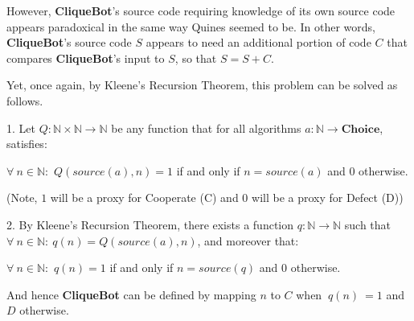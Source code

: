 However, \textbf{CliqueBot}'s source code requiring knowledge of its own source code appears paradoxical in the same way Quines seemed to be. In other words, \textbf{CliqueBot}'s source code $S$ appears to need an additional portion of code $C$ that compares \textbf{CliqueBot}'s input to $S$, so that $S = S + C$.

Yet, once again, by Kleene's Recursion Theorem, this problem can be solved as follows.

1. Let $Q: \mathbb{N} \times \mathbb{N} \rightarrow \mathbb{N}$ be any function that for all algorithms $a: \mathbb{N} \rightarrow \textbf{Choice}$, satisfies:
\begin{center}
    $\forall\ n \in \mathbb{N}:$ $Q(source(a), n) = 1$ if and only if $n = source(a)$ and $0$ otherwise.
\end{center}
(Note, $1$ will be a proxy for Cooperate (C) and $0$ will be a proxy for Defect (D))

2. By Kleene's Recursion Theorem, there exists a function $q: \mathbb{N} \rightarrow \mathbb{N}$ such that $\forall\ n \in \mathbb{N}:\ q(n) = Q(source(a), n)$, and moreover that:
\begin{center}
    $\forall\ n \in \mathbb{N}:$ $q(n) = 1$ if and only if $n = source(q)$ and $0$ otherwise.
\end{center}

And hence \textbf{CliqueBot} can be defined by mapping $n$ to $C$ when $\ q(n)\ = 1$ and $D$ otherwise.
